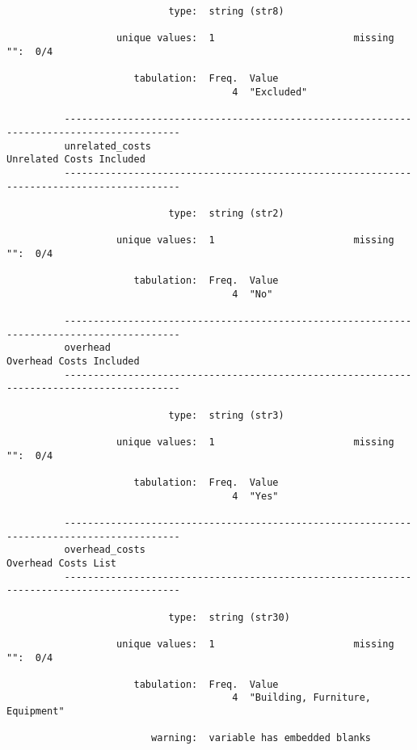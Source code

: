 \documentclass{article}
\begin{document}
\begin{verbatim}
                            type:  string (str8)
          
                   unique values:  1                        missing "":  0/4
          
                      tabulation:  Freq.  Value
                                       4  "Excluded"
          
          ------------------------------------------------------------------------------------------
          unrelated_costs                                                   Unrelated Costs Included
          ------------------------------------------------------------------------------------------
          
                            type:  string (str2)
          
                   unique values:  1                        missing "":  0/4
          
                      tabulation:  Freq.  Value
                                       4  "No"
          
          ------------------------------------------------------------------------------------------
          overhead                                                           Overhead Costs Included
          ------------------------------------------------------------------------------------------
          
                            type:  string (str3)
          
                   unique values:  1                        missing "":  0/4
          
                      tabulation:  Freq.  Value
                                       4  "Yes"
          
          ------------------------------------------------------------------------------------------
          overhead_costs                                                         Overhead Costs List
          ------------------------------------------------------------------------------------------
          
                            type:  string (str30)
          
                   unique values:  1                        missing "":  0/4
          
                      tabulation:  Freq.  Value
                                       4  "Building, Furniture, Equipment"
          
                         warning:  variable has embedded blanks
          

\end{verbatim}
\end{document}

